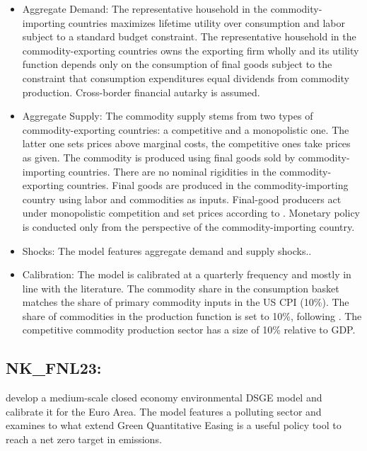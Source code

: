 \documentclass[11pt,a4paper]{article}
\begin{document}
	\begin{itemize}
		\item Aggregate Demand: The representative household in the commodity-importing countries maximizes lifetime utility over consumption and labor subject to a standard budget constraint. The representative household in the commodity-exporting countries owns the exporting firm wholly and its utility function depends only on the consumption of final goods subject to the constraint that consumption expenditures equal dividends from commodity production. Cross-border financial autarky is assumed.
		\item Aggregate Supply: The commodity supply stems from two types of commodity-exporting countries: a competitive and a monopolistic one. The latter one sets prices above marginal costs, the competitive ones take prices as given. The commodity is produced using final goods sold by commodity-importing countries. There are no nominal rigidities in the commodity-exporting countries. Final goods are produced in the commodity-importing country using labor and commodities as inputs. Final-good producers act under monopolistic competition and set prices according to \cite{Calvo1983}. Monetary policy is conducted only from the perspective of the commodity-importing country.
		\item Shocks: The model features aggregate demand and supply shocks..
		\item Calibration: The model is calibrated at a quarterly frequency and mostly in line with the literature. The commodity share in the consumption basket matches the share of primary commodity inputs in the US CPI (10\%). The share of commodities in the production function is set to 10\%, following \cite{arseneau2013commodity}. The competitive commodity production sector has a size of 10\% relative to GDP.
	\end{itemize}
	
	\subsection{NK\_FNL23: \texorpdfstring{\cite{ferraria2023toward}}{Ferrari and Nispi Landi (2023)}}
	\label{NKFNL23}
	\cite{ferraria2023toward} develop a medium-scale closed economy environmental DSGE model and calibrate it for the Euro Area. The model features a polluting sector and examines to what extend Green Quantitative Easing is a useful policy tool to reach a net zero target in emissions.
	
\end{document}
